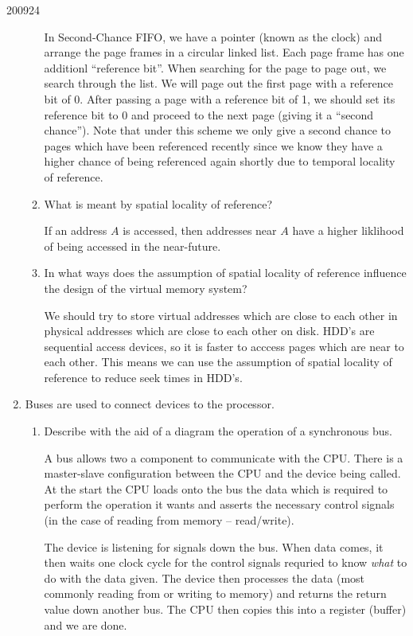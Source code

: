 \documentclass[10pt,\jkfside,a4paper]{article}
\begin{document}
\begin{examquestion}{2009}{2}{4}
\begin{enumerate}
\begin{enumerate}
In Second-Chance FIFO, we have a pointer (known as the clock) and arrange the page frames in a 
circular linked list. Each page frame has one additionl ``reference bit''. When searching for 
the page to page out, we search through the list. We will page out the first page with a 
reference bit of 0. After passing a page with a reference bit of 1, we should set its reference 
bit to 0 and proceed to the next page (giving it a ``second chance''). Note that under this scheme 
we only give a second chance to pages which have been referenced recently since we know they have a 
higher chance of being referenced again shortly due to temporal locality of reference.

\item What is meant by spatial locality of reference?

If an address $A$ is accessed, then addresses near $A$ have a higher liklihood of being 
accessed in the near-future.

\item In what ways does the assumption of spatial locality of reference influence
the design of the virtual memory system?

We should try to store virtual addresses which are close to each other in 
physical addresses which are close to each other on disk. HDD's are sequential 
access devices, so it is faster to acccess pages which are near to each other. 
This means we can use the assumption of spatial locality of reference to reduce 
seek times in HDD's.

\end{enumerate}

\item Buses are used to connect devices to the processor.

\begin{enumerate}

\item Describe with the aid of a diagram the operation of a synchronous bus.

A bus allows two a component to communicate with the CPU. 
There is a master-slave configuration between the CPU and the device being called. 
At the start the CPU loads onto the bus the data which is required to perform the 
operation it wants and asserts the necessary control signals (in the case of reading 
from memory -- read/write).

The device is listening for signals down the bus. When data comes, it then waits one clock 
cycle for the control signals requried to know \textit{what} to do with the data
given. The device then processes the data (most commonly reading from or writing to 
memory) and returns the return value down another bus. The CPU then copies this into a 
register (buffer) and we are done. 


\end{enumerate}
\end{enumerate}
\end{examquestion}
\end{document}

